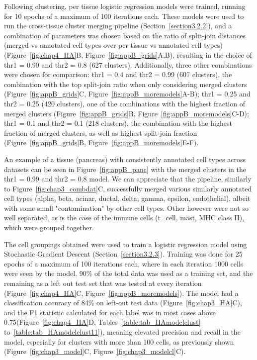 Following clustering, per tissue logistic regression models were trained, running for 10 epochs of a maximum of 100 iterations each. These models were used to run the cross-tissue cluster merging pipeline (Section~\ref{section3.2.2}), and a combination of parameters was chosen based on the ratio of split-join distances (merged vs annotated cell types over per tissue vs annotated cell types) (Figure~\ref{fig:chap4_HA}B, Figure~\ref{fig:appB_grids}A,B), resulting in the choice of thr1 = 0.99 and thr2 = 0.8 (627 clusters). Additionally, three other combinations were chosen for comparison: thr1 = 0.4 and thr2 = 0.99 (607 clusters), the combination with the top split-join ratio when only considering merged clusters (Figure~\ref{fig:appB_grids}C, Figure~\ref{fig:appB_moremodels}A-B); thr1 = 0.25 and thr2 = 0.25 (420 clusters), one of the combinations with the highest fraction of merged clusters (Figure~\ref{fig:appB_grids}B, Figure~\ref{fig:appB_moremodels}C-D); thr1 = 0.1 and thr2 = 0.1 (218 clusters), the combination with the highest fraction of merged clusters, as well as highest split-join fraction (Figure~\ref{fig:appB_grids}B, Figure~\ref{fig:appB_moremodels}E-F).

An example of a tissue (pancreas) with consistently annotated cell types across datasets can be seen in Figure~\ref{fig:appB_panc} with the merged clusters in the thr1 = 0.99 and thr2 = 0.8 model. We can appreciate that the pipeline, similarly to Figure~\ref{fig:chap3_combdat}C, successfully merged various similarly annotated cell types (alpha, beta, acinar, ductal, delta, gamma, epsilon, endothelial), albeit with some small "contamination" by other cell types. Other however were not so well separated, as is the case of the immune cells (t\_cell, mast, MHC class II), which were grouped together. 

The cell groupings obtained were used to train a logistic regression model using Stochastic Gradient Descent (Section~\ref{section3.2.3}). Training was done for 25 epochs of a maximum of 100 iterations each, where in each iteration 1000 cells were seen by the model. 90\% of the total data was used as a training set, and the remaining as a left out test set that was tested at every iteration (Figure~\ref{fig:chap4_HA}C, Figure~\ref{fig:appB_moremodels}). The model had a classification accuracy of 84\% on left-out test data (Figure~\ref{fig:chap3_HA}C), and the F1 statistic calculated for each label was in most cases above 0.75(Figure~\ref{fig:chap4_HA}D, Tables~\ref{table:tab_HAmodelclust} to~\ref{table:tab_HAmodelclust11}), meaning elevated precision and recall in the model, especially for clusters with more than 100 cells, as previously shown (Figure~\ref{fig:chap3_model}C, Figure~\ref{fig:chap3_modelcl}C).

